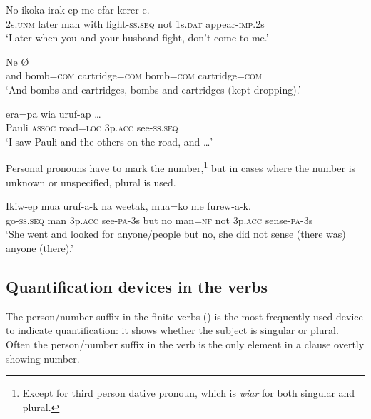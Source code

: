 \ea%
\label{ex:x1293}
\gll No  ikoka      irak-ep  me  efar kerer-e.\\
2s.\textsc{unm}  later  man  with  fight-\textsc{ss}.\textsc{seq}  not  1s.\textsc{dat} appear-\textsc{imp}.2s\\
\glt `Later when you and your husband fight, don't come to me.'
\z

\ea%
\label{ex:x1294}
\gll Ne         {\O} \\
and  bomb=\textsc{com}  cartridge=\textsc{com}  bomb=\textsc{com}  cartridge=\textsc{com}\\
\glt `And bombs and cartridges, bombs and cartridges (kept dropping).'
\z

\ea%
\label{ex:x1295}
\gll {}    era=pa  wia  uruf-ap  {\dots} \\
Pauli  \textsc{assoc}  road=\textsc{loc}  3p.\textsc{acc}  see-\textsc{ss}.\textsc{seq}\\
\glt `I saw Pauli and the others on the road, and {\dots}'
\z

Personal pronouns have to mark the number,\footnote{Except for third person dative pronoun, which is \textit{wiar} for both singular and plural.} but in cases where the number is unknown or unspecified, plural is used.

\ea%
\label{ex:x1309}
\gll Ikiw-ep  mua    uruf-a-k  na  weetak,  mua=ko  me   furew-a-k. \\
go-\textsc{ss}.\textsc{seq}  man  3p.\textsc{acc}  see-\textsc{pa}-3s  but  no  man=\textsc{nf}  not 3p.\textsc{acc}  sense-\textsc{pa}-3s\\
\glt `She went and looked for anyone/people but no, she did not sense (there was) anyone (there).'
\z

\subsection{Quantification devices in the verbs}
{}
The person/number suffix in the finite verbs () is the most frequently used device to indicate quantification: it shows whether the subject is singular or plural. Often the person/number suffix in the verb is the only element in a clause overtly showing number. 

